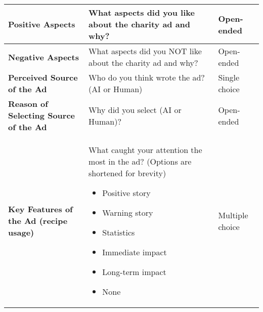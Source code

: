 \begin{table}[httb]
{\begin{tabular}{|p{5cm}|p{7cm}|p{3cm}|}
\textbf{Positive Aspects} & 
What aspects did you like about the charity ad and why? & Open-ended \\ 
\hline

\textbf{Negative Aspects} & 
What aspects did you NOT like about the charity ad and why? & Open-ended \\ 
\hline

\textbf{Perceived Source of the Ad} & 
Who do you think wrote the ad? (AI or Human) & Single choice \\ 
\hline

\textbf{Reason of Selecting Source of the Ad} & 
Why did you select (AI or Human)?  & Open-ended \\ 
\hline

\textbf{Key Features of the Ad (recipe usage)} & 
What caught your attention the most in the ad? (Options are shortened for brevity)
\begin{itemize}[nosep]
    \item Positive story
    \item Warning story
    \item Statistics
    \item Immediate impact
    \item Long-term impact
    \item None
\end{itemize}
& Multiple choice \\ 
\hline


\end{tabular}}
\end{table}

